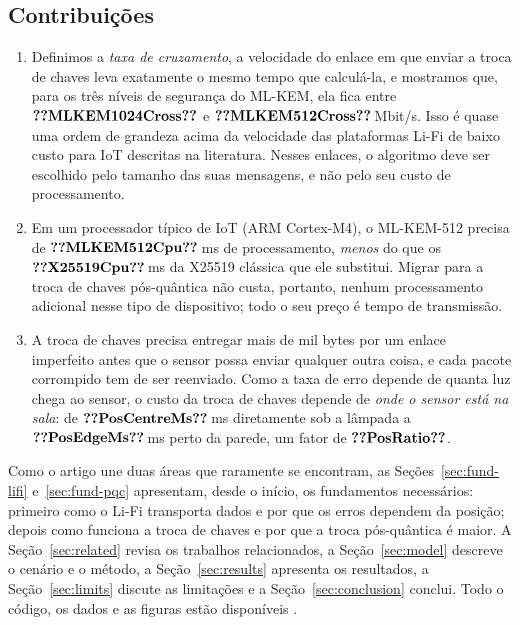 \subsection{Contribuições}
\begin{enumerate}
\item Definimos a \emph{taxa de cruzamento}, a velocidade do enlace em que
      enviar a troca de chaves leva exatamente o mesmo tempo que calculá-la, e
      mostramos que, para os três níveis de segurança do ML-KEM, ela fica entre
      $\val{MLKEM1024Cross}$ e $\val{MLKEM512Cross}$\,Mbit/s. Isso é quase uma
      ordem de grandeza acima da velocidade das plataformas Li-Fi de baixo
      custo para IoT descritas na literatura. Nesses enlaces, o algoritmo deve
      ser escolhido pelo tamanho das suas mensagens, e não pelo seu custo de
      processamento.
\item Em um processador típico de IoT (ARM Cortex-M4), o ML-KEM-512 precisa de
      $\val{MLKEM512Cpu}$\,ms de processamento, \emph{menos} do que os
      $\val{X25519Cpu}$\,ms da X25519 clássica que ele substitui. Migrar para a
      troca de chaves pós-quântica não custa, portanto, nenhum processamento
      adicional nesse tipo de dispositivo; todo o seu preço é tempo de
      transmissão.
\item A troca de chaves precisa entregar mais de mil bytes por um enlace
      imperfeito antes que o sensor possa enviar qualquer outra coisa, e cada
      pacote corrompido tem de ser reenviado. Como a taxa de erro depende de
      quanta luz chega ao sensor, o custo da troca de chaves depende de
      \emph{onde o sensor está na sala}: de $\val{PosCentreMs}$\,ms
      diretamente sob a lâmpada a $\val{PosEdgeMs}$\,ms perto da parede, um
      fator de $\val{PosRatio}$.
\end{enumerate}

Como o artigo une duas áreas que raramente se encontram, as
Seções~\ref{sec:fund-lifi} e~\ref{sec:fund-pqc} apresentam, desde o início, os
fundamentos necessários: primeiro como o Li-Fi transporta dados e por que os
erros dependem da posição; depois como funciona a troca de chaves e por que a
troca pós-quântica é maior. A Seção~\ref{sec:related} revisa os trabalhos
relacionados, a Seção~\ref{sec:model} descreve o cenário e o método, a
Seção~\ref{sec:results} apresenta os resultados, a Seção~\ref{sec:limits}
discute as limitações e a Seção~\ref{sec:conclusion} conclui. Todo o código,
os dados e as figuras estão disponíveis \repositorio.

